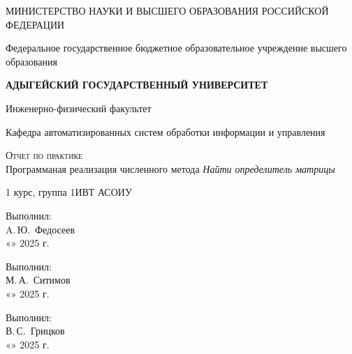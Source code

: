 \documentclass[12pt,a4paper]{scrartcl}
\begin{document}
	\begin{titlepage}
		\begin{center}
			\large
			МИНИСТЕРСТВО НАУКИ И ВЫСШЕГО ОБРАЗОВАНИЯ РОССИЙСКОЙ ФЕДЕРАЦИИ
			
			Федеральное государственное бюджетное образовательное учреждение высшего образования
			
			\textbf{АДЫГЕЙСКИЙ ГОСУДАРСТВЕННЫЙ УНИВЕРСИТЕТ}
			\vspace{0.25cm}
			
			Инженерно-физический факультет
			
			Кафедра автоматизированных систем обработки информации и управления
			\vfill

			\vfill
			
			\textsc{Отчет по практике}\\[5mm]
			
			{\LARGE Программаная реализация численного метода \textit{Найти определитель матрицы}}
			\bigskip
			
			1 курс, группа 1ИВТ АСОИУ
		\end{center}
		\vfill
		
		\newlength{\ML}
		\hfill\begin{minipage}{0.5\textwidth}
			Выполнил:\\
			\underline{\hspace{\ML}} A.\,Ю.~Федосеев\\
			«\underline{\hspace{0.7cm}}» \underline{\hspace{2cm}} 2025 г.
		\end{minipage}%
		\bigskip

            \newlength{\ML}
		\hfill\begin{minipage}{0.5\textwidth}
			Выполнил:\\
			\underline{\hspace{\ML}} М.\,А.~Ситимов\\
			«\underline{\hspace{0.7cm}}» \underline{\hspace{2cm}} 2025 г.
		\end{minipage}%
		\bigskip

            \newlength{\ML}
		\hfill\begin{minipage}{0.5\textwidth}
			Выполнил:\\
			\underline{\hspace{\ML}} В.\,С.~Грицков\\
			«\underline{\hspace{0.7cm}}» \underline{\hspace{2cm}} 2025 г.
		\end{minipage}%
		\bigskip
		

\end{titlepage}
\end{document}
